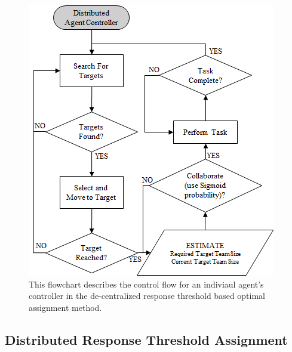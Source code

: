 \documentclass[defaultstyle,12pt]{thesis}
\begin{document}
\begin{figure}[!ht]
\centering\includegraphics[width=.5\columnwidth]{../assets/DistributedController.png}
\centering\caption{This flowchart describes the control flow for an indiviaul agent's controller in the de-centralized response threshold based optimal assignment method.}\label{fig:distcontrol}
\end{figure}

\subsection{Distributed Response Threshold Assignment}
\end{document}
